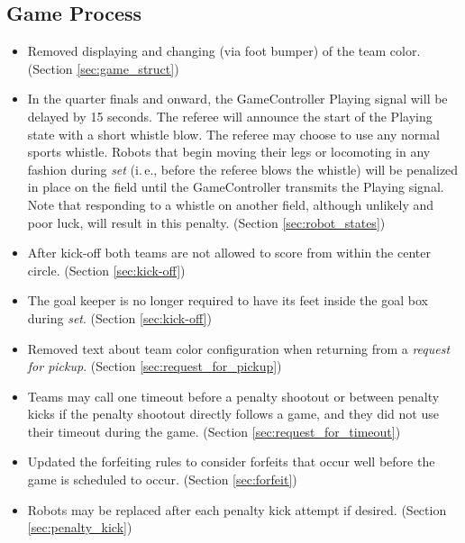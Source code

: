 \documentclass[12pt]{article}
\newcommand{\ie}{\mbox{i.\,e.}\xspace}
\begin{document}
\subsection*{Game Process}
\begin{itemize}
    \item Removed displaying and changing (via foot bumper) of the team color. (Section \ref{sec:game_struct})
	\item In the quarter finals and onward, the GameController Playing signal will be delayed by 15 seconds.  The referee will announce the start of the Playing state with a short whistle blow.  The referee may choose to use any normal sports whistle.  Robots that begin moving their legs or locomoting in any fashion during \emph{set} (\ie, before the referee blows the whistle) will be penalized in place on the field until the GameController transmits the Playing signal.  Note that responding to a whistle on another field, although unlikely and poor luck, will result in this penalty. (Section \ref{sec:robot_states})
	\item After kick-off both teams are not allowed to score from within the center circle. (Section \ref{sec:kick-off})
	\item The goal keeper is no longer required to have its feet inside the goal box during \emph{set}. (Section \ref{sec:kick-off})
	\item Removed text about team color configuration when returning from a \emph{request for pickup}. (Section \ref{sec:request_for_pickup})
	\item Teams may call one timeout before a penalty shootout or between penalty kicks if the penalty shootout directly follows a game, and they did not use their timeout during the game. (Section \ref{sec:request_for_timeout})
	\item Updated the forfeiting rules to consider forfeits that occur well before the game is scheduled to occur. (Section \ref{sec:forfeit})
	\item Robots may be replaced after each penalty kick attempt if desired. (Section \ref{sec:penalty_kick})
\end{itemize}
\end{document}
